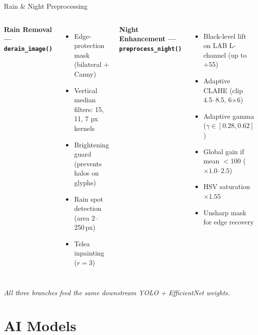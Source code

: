 \documentclass[aspectratio=169,11pt]{beamer}
\begin{document}
\begin{frame}{Rain \& Night Preprocessing}
  \begin{columns}[T]
    \textbf{Rain Removal --- \texttt{derain\_image()}}
    \begin{itemize}
      \item Edge-protection mask (bilateral + Canny)
      \item Vertical median filters: 15, 11, 7 px kernels
      \item Brightening guard (prevents halos on glyphs)
      \item Rain spot detection (area 2--250\,px)
      \item Telea inpainting ($r{=}3$)
    \end{itemize}
    \textbf{Night Enhancement --- \texttt{preprocess\_night()}}
    \begin{itemize}
      \item Black-level lift on LAB L-channel (up to +55)
      \item Adaptive CLAHE (clip 4.5--8.5, 6$\times$6)
      \item Adaptive gamma ($\gamma \in [0.28, 0.62]$)
      \item Global gain if mean $< 100$ ($\times 1.0$--$2.5$)
      \item HSV saturation $\times 1.55$
      \item Unsharp mask for edge recovery
    \end{itemize}
  \end{columns}
  \vspace{0.5em}
  \centering
  \textit{All three branches feed the same downstream YOLO + EfficientNet weights.}
\end{frame}

\section{AI Models}
\end{document}
